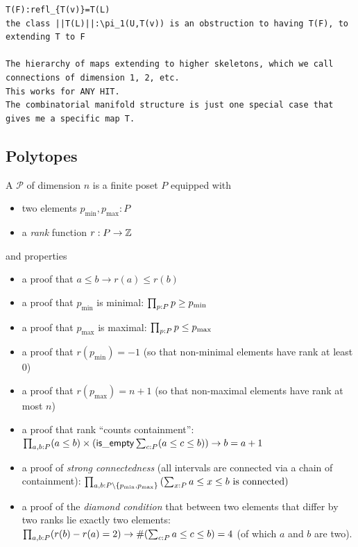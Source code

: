 \begin{verbatim}
T(F):refl_{T(v)}=T(L)
the class ||T(L)||:\pi_1(U,T(v)) is an obstruction to having T(F), to extending T to F

The hierarchy of maps extending to higher skeletons, which we call connections of dimension 1, 2, etc.
This works for ANY HIT.
The combinatorial manifold structure is just one special case that gives me a specific map T.
\end{verbatim}

\subsection{Polytopes}

\begin{mydef}
A  \( \mathcal{P} \) of dimension \( n \) is a finite poset \( P \) equipped with 
\begin{itemize}
\item two elements \( p_{\mathrm{min}}, p_{\mathrm{max}}:P \)
\item a \emph{rank} function \( r:P\to \mathbb{Z} \)
\end{itemize}
and properties
\begin{itemize}
\item a proof that \( a\leq b\to r(a)\leq r(b) \)
\item a proof that \( p_{\mathrm{min}} \) is minimal: \( \prod_{p:P}p\geq p_{\mathrm{min}} \)
\item a proof that \( p_{\mathrm{max}} \) is maximal: \( \prod_{p:P}p\leq p_{\mathrm{max}} \)
\item a proof that \( r(p_{\mathrm{min}}) = -1 \) (so that non-minimal elements have rank at least 0)
\item a proof that \( r(p_{\mathrm{max}}) = n+1 \) (so that non-maximal elements have rank at most \( n \))
\item a proof that rank ``counts containment'': \( \prod_{a,b:P}(a\leq b)\times (\mathsf{is\_empty}\sum_{c:P}(a\leq c\leq b))\to b=a+1 \)
\item a proof of \emph{strong connectedness} (all intervals are connected via a chain of containment): \newline\( \prod_{a,b:P\setminus\{p_{\mathrm{min}}, p_{\mathrm{max}}\}}\left(\sum_{x:P}a\leq x\leq b\text{ is connected}\right) \)
\item a proof of the \emph{diamond condition} that between two elements that differ by two ranks lie exactly two elements: \( \prod_{a,b:P}(r(b)-r(a)=2)\to \#(\sum_{c:P}a\leq c\leq b)=4 \) (of which \( a \) and \( b \) are two).
\end{itemize}
\end{mydef}

